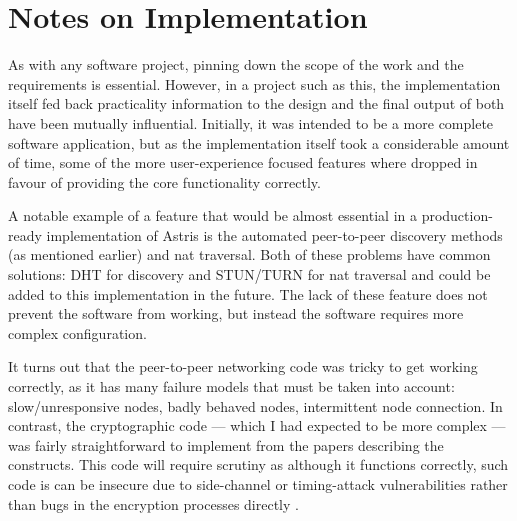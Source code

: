 \section{Notes on Implementation}
\label{ch:sw:notes}

As with any software project, pinning down the scope of the work and the requirements is essential. However, in a project such as this, the implementation itself fed back practicality information to the design and the final output of both have been mutually influential. Initially, it was intended to be a more complete software application, but as the implementation itself took a considerable amount of time, some of the more user-experience focused features where dropped in favour of providing the core functionality correctly.

A notable example of a feature that would be almost essential in a production-ready implementation of Astris is the automated peer-to-peer discovery methods (as mentioned earlier) and \gls{nat} traversal. Both of these problems have common solutions: DHT  for discovery and STUN/TURN  for \gls{nat} traversal and could be added to this implementation in the future. The lack of these feature does not prevent the software from working, but instead the software requires more complex configuration.

It turns out that the peer-to-peer networking code was tricky to get working correctly, as it has many failure models that must be taken into account: slow/unresponsive nodes, badly behaved nodes, intermittent node connection. In contrast, the cryptographic code --- which I had expected to be more complex --- was fairly straightforward to implement from the papers  describing the constructs. This code will require scrutiny as although it functions correctly, such code is can be insecure due to side-channel or timing-attack vulnerabilities rather than bugs in the encryption processes directly .


